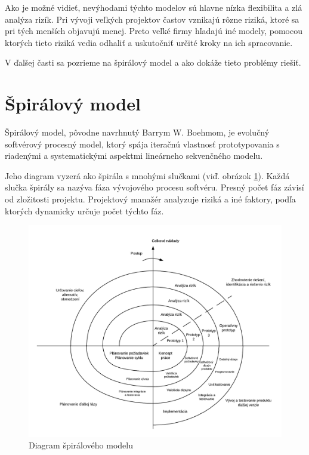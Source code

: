 \documentclass[10pt,twoside,slovak,a4paper]{article}
\begin{document}
Ako je možné vidieť, nevýhodami týchto modelov sú hlavne nízka flexibilita a zlá analýza rizík. Pri vývoji veľkých projektov častov vznikajú rôzne riziká, ktoré sa pri tých menších objavujú menej. Preto veľké firmy hľadajú iné modely, pomocou ktorých tieto riziká vedia odhaliť a uskutočniť určité kroky na ich spracovanie.

V ďalšej časti sa pozrieme na špirálový model a ako dokáže tieto problémy riešiť.

\pagebreak

\section{Špirálový model} \label{spiralModel}
Špirálový model, pôvodne navrhnutý Barrym W. Boehmom, je evolučný softvérový procesný model, ktorý spája iteračnú vlastnosť prototypovania s riadenými a systematickými aspektmi lineárneho sekvenčného modelu. \cite{SpiralModelDef}

Jeho diagram vyzerá ako špirála s mnohými slučkami (viď. obrázok \ref{spiralDiagram}). Každá slučka špirály sa nazýva fáza vývojového procesu softvéru. Presný počet fáz závisí od zložitosti projektu. Projektový manažér analyzuje riziká a iné faktory, podľa ktorých dynamicky určuje počet týchto fáz.

\begin{figure}[h]
\includegraphics[width=\textwidth]{spiralModel.png}
\caption{Diagram špirálového modelu \cite{Boehm}} 
\label{spiralDiagram}
\end{figure} 
\end{document}
